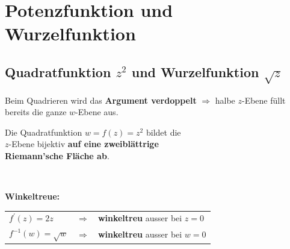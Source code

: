 \section{Potenzfunktion und Wurzelfunktion}
	\subsection{Quadratfunktion $z^2$ und Wurzelfunktion $\sqrt{z}$}
		Beim Quadrieren wird das \textbf{Argument verdoppelt} $\Rightarrow$ halbe $z$-Ebene füllt bereits die ganze $w$-Ebene aus.\\[3pt]
		\begin{minipage}[t]{0.5\textwidth}
			\scalebox{0.5}{}
		\end{minipage}
		\begin{minipage}[t]{0.5\textwidth}
			\scalebox{0.5}{}
		\end{minipage}
		\begin{minipage}[]{0.5\textwidth}
			\begin{framed}
				Die Quadratfunktion $w = f\left( z \right) = z^2$ bildet die\\[3pt]
				$z$-Ebene bijektiv \textbf{auf eine zweiblättrige\\[3pt] Riemann'sche Fläche ab}.
			\end{framed}
		\end{minipage}
		\begin{minipage}[]{0.5\textwidth}
		\end{minipage}\\[3pt]
		\begin{minipage}[]{0.15\textwidth}
			\textbf{Winkeltreue:}
		\end{minipage}
		\begin{minipage}[]{0.5\textwidth}
			\begin{framed}
				\begin{tabular}{lll}
					$f^{\prime}\left( z \right) = 2 z$ & $\Rightarrow$ & \textbf{winkeltreu} ausser bei $z = 0$\\[3pt]
					$f^{-1}\left( w \right) = \sqrt{w}$ & $\Rightarrow$ & \textbf{winkeltreu} ausser bei $w = 0$\\[3pt]
				\end{tabular}
			\end{framed}
		\end{minipage}
